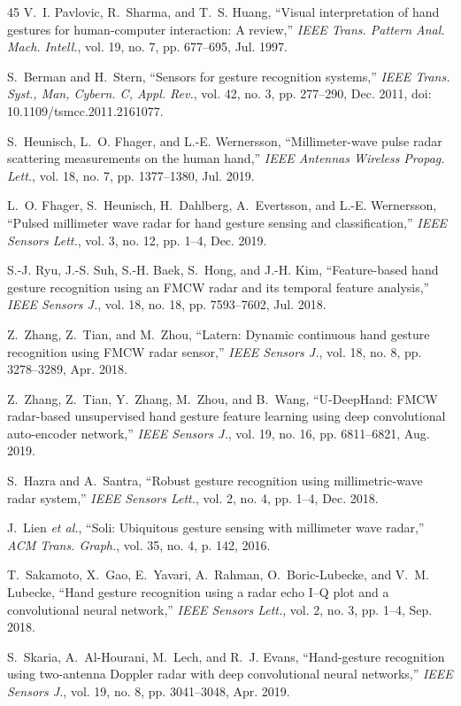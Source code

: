 \begin{TranslationNoMiniToc}
\begin{thebibliography}{45}
V.~I. Pavlovic, R.~Sharma, and T.~S. Huang, ``Visual interpretation of hand gestures for human-computer interaction: A review,'' \emph{IEEE Trans. Pattern Anal. Mach. Intell.}, vol. 19, no. 7, pp. 677--695, Jul. 1997.

S.~Berman and H.~Stern, ``Sensors for gesture recognition systems,'' \emph{IEEE Trans. Syst., Man, Cybern. C, Appl. Rev.}, vol. 42, no. 3, pp. 277--290, Dec. 2011, doi: 10.1109/tsmcc.2011.2161077.

S.~Heunisch, L.~O. Fhager, and L.-E. Wernersson, ``Millimeter-wave pulse radar scattering measurements on the human hand,'' \emph{IEEE Antennas Wireless Propag. Lett.}, vol. 18, no. 7, pp. 1377--1380, Jul. 2019.

L.~O. Fhager, S.~Heunisch, H.~Dahlberg, A.~Evertsson, and L.-E. Wernersson, ``Pulsed millimeter wave radar for hand gesture sensing and classification,'' \emph{IEEE Sensors Lett.}, vol. 3, no. 12, pp. 1--4, Dec. 2019.

S.-J. Ryu, J.-S. Suh, S.-H. Baek, S.~Hong, and J.-H. Kim, ``Feature-based hand gesture recognition using an FMCW radar and its temporal feature analysis,'' \emph{IEEE Sensors J.}, vol. 18, no. 18, pp. 7593--7602, Jul. 2018.

Z.~Zhang, Z.~Tian, and M.~Zhou, ``Latern: Dynamic continuous hand gesture recognition using FMCW radar sensor,'' \emph{IEEE Sensors J.}, vol. 18, no. 8, pp. 3278--3289, Apr. 2018.

Z.~Zhang, Z.~Tian, Y.~Zhang, M.~Zhou, and B.~Wang, ``U-DeepHand: FMCW radar-based unsupervised hand gesture feature learning using deep convolutional auto-encoder network,'' \emph{IEEE Sensors J.}, vol. 19, no. 16, pp. 6811--6821, Aug. 2019.

S.~Hazra and A.~Santra, ``Robust gesture recognition using millimetric-wave radar system,'' \emph{IEEE Sensors Lett.}, vol. 2, no. 4, pp. 1--4, Dec. 2018.

J.~Lien \emph{et al.}, ``Soli: Ubiquitous gesture sensing with millimeter wave radar,'' \emph{ACM Trans. Graph.}, vol. 35, no. 4, p. 142, 2016.

T.~Sakamoto, X.~Gao, E.~Yavari, A.~Rahman, O.~Boric-Lubecke, and V.~M. Lubecke, ``Hand gesture recognition using a radar echo I--Q plot and a convolutional neural network,'' \emph{IEEE Sensors Lett.}, vol. 2, no. 3, pp. 1--4, Sep. 2018.

S.~Skaria, A.~Al-Hourani, M.~Lech, and R.~J. Evans, ``Hand-gesture recognition using two-antenna Doppler radar with deep convolutional neural networks,'' \emph{IEEE Sensors J.}, vol. 19, no. 8, pp. 3041--3048, Apr. 2019.


\end{thebibliography}
\end{TranslationNoMiniToc}
